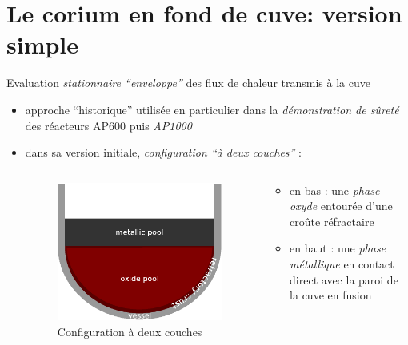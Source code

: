\section{Le corium en fond de cuve: version simple}
\begin{frame}[fragile]
Evaluation \emph{stationnaire ``enveloppe''} des flux de chaleur transmis à la cuve
\begin{itemize}
\item approche ``historique'' utilisée en particulier dans la \emph{démonstration de sûreté} des réacteurs AP600 puis \emph{AP1000} \cite{Esmaili2004} 
\item dans sa version initiale, \emph{configuration ``à deux couches''} :
\begin{columns}[T]
    \begin{column}{0.35\textwidth}
      \begin{figure}[H]
\centering \includegraphics[height=0.4\textheight]{Figures/TD_2layer_2.eps}
\caption{Configuration à deux couches}
      \end{figure}
    \end{column}
    \begin{column}{0.65\textwidth}
    \begin{itemize}
    \item en bas : une \emph{phase oxyde} entourée d'une croûte réfractaire 
    \item en haut : une \emph{phase métallique} en contact direct avec la paroi de la cuve en fusion

\end{itemize}
\end{column}
\end{columns}
\end{itemize}
\end{frame}
